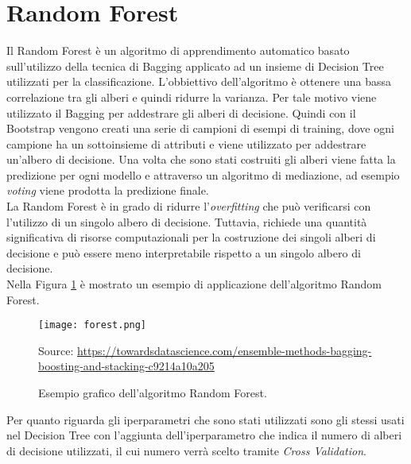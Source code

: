 \section{Random Forest}
Il Random Forest \autocite{ho1995random} è un algoritmo di apprendimento automatico basato sull'utilizzo della tecnica di Bagging applicato ad un insieme di Decision Tree utilizzati per la classificazione. L'obbiettivo dell'algoritmo è ottenere una bassa correlazione tra gli alberi e quindi ridurre la varianza. Per tale motivo viene utilizzato il Bagging per addestrare gli alberi di decisione. Quindi con il Bootstrap vengono creati una serie di campioni di esempi di training, dove ogni campione ha un sottoinsieme di attributi e viene utilizzato per addestrare un'albero di decisione. Una volta che sono stati costruiti gli alberi viene fatta la predizione per ogni modello e attraverso un algoritmo di mediazione, ad esempio \emph{voting} viene prodotta la predizione finale.\\
La Random Forest è in grado di ridurre l'\emph{overfitting} che può verificarsi con l'utilizzo di un singolo albero di decisione. Tuttavia, richiede una quantità significativa di risorse computazionali per la costruzione dei singoli alberi di decisione e può essere meno interpretabile rispetto a un singolo albero di decisione.\\
Nella Figura \ref{fig:forest} è mostrato un esempio di applicazione dell'algoritmo Random Forest.
\begin{figure}[h]
	\begin{center}
		\texttt{[image: forest.png]}
		\caption{Esempio grafico dell'algoritmo Random Forest.
		} 
		Source: \url{https://towardsdatascience.com/ensemble-methods-bagging-boosting-and-stacking-c9214a10a205}\label{fig:forest}
	\end{center}
\end{figure}
Per quanto riguarda gli iperparametri che sono stati utilizzati sono gli stessi usati nel Decision Tree con l'aggiunta dell'iperparametro che indica il numero di alberi di decisione utilizzati, il cui numero verrà scelto tramite \emph{Cross Validation}.
